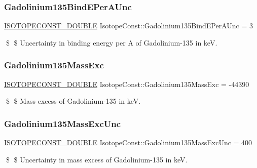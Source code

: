 \subsubsection{\texorpdfstring{Gadolinium135\+Bind\+E\+Per\+A\+Unc}{Gadolinium135BindEPerAUnc}}
{\footnotesize\ttfamily \mbox{\hyperlink{group___isotope_const-_macros_ga8f45a7272ce02c0b4c65c44636ed719a}{I\+S\+O\+T\+O\+P\+E\+C\+O\+N\+S\+T\+\_\+\+D\+O\+U\+B\+LE}} Isotope\+Const\+::\+Gadolinium135\+Bind\+E\+Per\+A\+Unc = 3}

\$ \$ Uncertainty in binding energy per A of Gadolinium-\/135 in keV. \mbox{\label{group___isotope_const-_gadolinium-_gd135_ga17661657c911873cee929ea57e6d03d7}} 
\subsubsection{\texorpdfstring{Gadolinium135\+Mass\+Exc}{Gadolinium135MassExc}}
{\footnotesize\ttfamily \mbox{\hyperlink{group___isotope_const-_macros_ga8f45a7272ce02c0b4c65c44636ed719a}{I\+S\+O\+T\+O\+P\+E\+C\+O\+N\+S\+T\+\_\+\+D\+O\+U\+B\+LE}} Isotope\+Const\+::\+Gadolinium135\+Mass\+Exc = -\/44390}

\$ \$ Mass excess of Gadolinium-\/135 in keV. \mbox{\label{group___isotope_const-_gadolinium-_gd135_ga21151e9d18f1523bfe21aa47e7528f27}} 
\subsubsection{\texorpdfstring{Gadolinium135\+Mass\+Exc\+Unc}{Gadolinium135MassExcUnc}}
{\footnotesize\ttfamily \mbox{\hyperlink{group___isotope_const-_macros_ga8f45a7272ce02c0b4c65c44636ed719a}{I\+S\+O\+T\+O\+P\+E\+C\+O\+N\+S\+T\+\_\+\+D\+O\+U\+B\+LE}} Isotope\+Const\+::\+Gadolinium135\+Mass\+Exc\+Unc = 400}

\$ \$ Uncertainty in mass excess of Gadolinium-\/135 in keV. \mbox{\label{group___isotope_const-_gadolinium-_gd135_ga8aeae2864824ab8d56d0caeed819ddb6}} 
